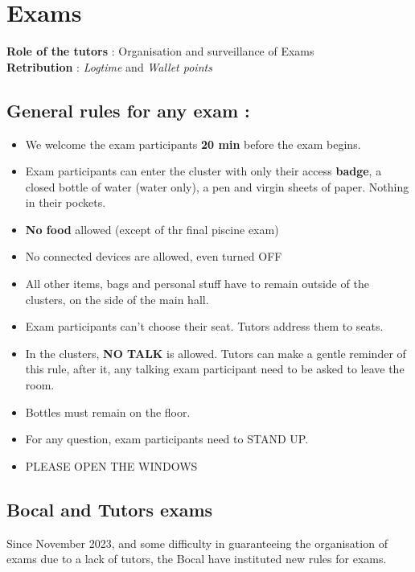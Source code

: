 \documentclass{article}
\begin{document}
\clearpage

\section{Exams}

\textbf{Role of the tutors} : Organisation and surveillance of Exams
\\
\textbf{Retribution} : \textit{Logtime} and \textit{Wallet points}

\subsection{General rules for any exam :}
\begin{itemize}
    \item We welcome the exam participants \textbf{20 min} before the exam begins.
    \item Exam participants can enter the cluster with only their access \textbf{badge}, a closed bottle of water (water only), a pen and virgin sheets of paper. Nothing in their pockets.
    \item \textbf{No food} allowed (except of thr final piscine exam)
    \item No connected devices are allowed, even turned OFF
    \item All other items, bags and personal stuff have to remain outside of the clusters, on the side of the main hall.
    \item Exam participants can't choose their seat. Tutors address them to seats.
    \item In the clusters, \textbf{NO TALK} is allowed. Tutors can make a gentle reminder of this rule, after it, any talking exam participant need to be asked to leave the room.
    \item Bottles must remain on the floor.
    \item For any question, exam participants need to STAND UP.
    \item PLEASE OPEN THE WINDOWS
\end{itemize}


\subsection{Bocal and Tutors exams}

Since November 2023, and some difficulty in guaranteeing the organisation of exams due to a lack of tutors, the Bocal have instituted new rules for exams.
\end{document}
